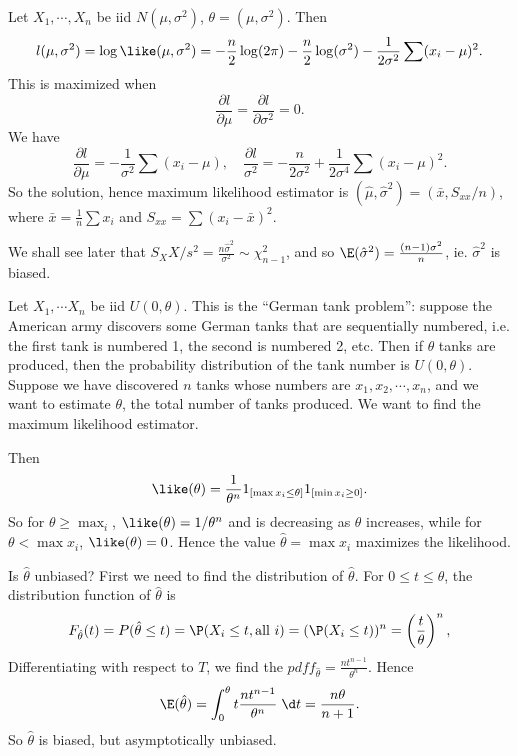\documentclass[a4paper]{article}
\begin{document}
\begin{eg}
  Let $X_1, \cdots, X_n$ be iid $N(\mu, \sigma^2)$, $\theta = (\mu, \sigma^2)$. Then
  \[
    l(\mu, \sigma^2) = \log\like(\mu, \sigma^2) = -\frac{n}{2}\log (2\pi) - \frac{n}{2}\log (\sigma^2) - \frac{1}{2\sigma^2}\sum (x_i - \mu)^2.
  \]
  This is maximized when
  \[
    \frac{\partial l}{\partial\mu} = \frac{\partial l}{\partial \sigma^2} = 0.
  \]
  We have
  \[
    \frac{\partial l}{\partial \mu} = -\frac{1}{\sigma^2}\sum (x_i - \mu), \quad \frac{\partial l}{\sigma^2} = -\frac{n}{2\sigma^2} + \frac{1}{2\sigma^4}\sum (x_i - \mu)^2.
  \]
  So the solution, hence maximum likelihood estimator is $(\hat{\mu}, \hat{\sigma}^2) = (\bar x, S_{xx}/n)$, where $\bar{x} = \frac{1}{n}\sum x_i$ and $S_{xx} = \sum(x_i - \bar{x})^2$.

  We shall see later that $S_XX/s^2 = \frac{n\hat{\sigma}^2}{\sigma^2}\sim \chi_{n - 1}^2$, and so $\E(\hat{\sigma}^2) = \frac{(n - 1)\sigma^2}{n}$, ie. $\hat{\sigma}^2$ is biased.
\end{eg}

\begin{eg}
  Let $X_1, \cdots X_n$ be iid $U(0, \theta)$. This is the ``German tank problem'': suppose the American army discovers some German tanks that are sequentially numbered, i.e. the first tank is numbered 1, the second is numbered 2, etc. Then if $\theta$ tanks are produced, then the probability distribution of the tank number is $U(0, \theta)$. Suppose we have discovered $n$ tanks whose numbers are $x_1, x_2, \cdots, x_n$, and we want to estimate $\theta$, the total number of tanks produced. We want to find the maximum likelihood estimator.
  
  Then
  \[
    \like(\theta) = \frac{1}{\theta^n}1_{[\max x_i \leq \theta]}1_{[\min x_i\geq 0]}.
  \]
  So for $\theta\geq \max _i$, $\like (\theta) = 1/\theta^n$ and is decreasing as $\theta$ increases, while for $\theta < \max x_i$, $\like (\theta) = 0$. Hence the value $\hat{\theta} = \max x_i$ maximizes the likelihood.

  Is $\hat{\theta}$ unbiased? First we need to find the distribution of $\hat{\theta}$. For $0 \leq t \leq \theta$, the distribution function of $\hat{\theta}$ is
  \[
    F_{\hat{\theta}}(t) = P(\hat{\theta} \leq t) = \P(X_i \leq t, \text{all }i) = (\P(X_i \leq t))^n = \left(\frac{t}{\theta}\right)^n,
  \]
  Differentiating with respect to $T$, we find the $pdf f_{\hat{\theta}} = \frac{nt^{n - 1}}{\theta^n}$. Hence
  \[
    \E(\hat{\theta}) = \int_0^\theta t\frac{nt^{n - 1}}{\theta^n} \;\d t = \frac{n\theta}{n + 1}.
  \]
  So $\hat{\theta}$ is biased, but asymptotically unbiased.
\end{eg}
\end{document}
